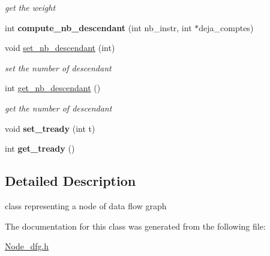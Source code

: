 \begin{DoxyCompactItemize}
\begin{DoxyCompactList}\small\item\em get the weight \end{DoxyCompactList}\item 
\hypertarget{class_node__dfg_a613aa3ee9ce2eb99df07258cbdd5293f}{int {\bfseries compute\+\_\+nb\+\_\+descendant} (int nb\+\_\+instr, int $\ast$deja\+\_\+comptes)}\label{class_node__dfg_a613aa3ee9ce2eb99df07258cbdd5293f}

\item 
\hypertarget{class_node__dfg_a9aa775f727e6c542cd714894219046f3}{void \hyperlink{class_node__dfg_a9aa775f727e6c542cd714894219046f3}{set\+\_\+nb\+\_\+descendant} (int)}\label{class_node__dfg_a9aa775f727e6c542cd714894219046f3}

\begin{DoxyCompactList}\small\item\em set the number of descendant \end{DoxyCompactList}\item 
\hypertarget{class_node__dfg_a9baa0a6be056b7d1ee290c404f2216f5}{int \hyperlink{class_node__dfg_a9baa0a6be056b7d1ee290c404f2216f5}{get\+\_\+nb\+\_\+descendant} ()}\label{class_node__dfg_a9baa0a6be056b7d1ee290c404f2216f5}

\begin{DoxyCompactList}\small\item\em get the number of descendant \end{DoxyCompactList}\item 
\hypertarget{class_node__dfg_ad9fe88cf90fa2282806edbc64f51331e}{void {\bfseries set\+\_\+tready} (int t)}\label{class_node__dfg_ad9fe88cf90fa2282806edbc64f51331e}

\item 
\hypertarget{class_node__dfg_a05e8db316dd2db8b0946167763585c7b}{int {\bfseries get\+\_\+tready} ()}\label{class_node__dfg_a05e8db316dd2db8b0946167763585c7b}

\end{DoxyCompactItemize}


\subsection{Detailed Description}
class representing a node of data flow graph 

The documentation for this class was generated from the following file\+:\begin{DoxyCompactItemize}
\item 
\hyperlink{_node__dfg_8h}{Node\+\_\+dfg.\+h}\end{DoxyCompactItemize}
